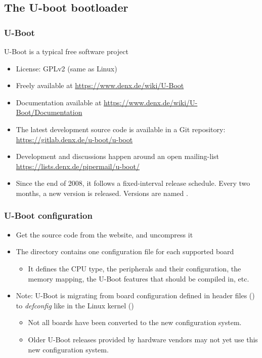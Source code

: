 \subsection{The U-boot bootloader}

\begin{frame}
  \frametitle{U-Boot}
  U-Boot is a typical free software project
  \begin{itemize}
  \item License: GPLv2 (same as Linux)
  \item Freely available at \url{https://www.denx.de/wiki/U-Boot}
  \item Documentation available at
    \url{https://www.denx.de/wiki/U-Boot/Documentation}
  \item The latest development source code is available in a Git
    repository:
    \url{https://gitlab.denx.de/u-boot/u-boot}
  \item Development and discussions happen around an open mailing-list
    \url{https://lists.denx.de/pipermail/u-boot/}
  \item Since the end of 2008, it follows a fixed-interval release
    schedule. Every two months, a new version is released. Versions
    are named .
\end{itemize}
\end{frame}

\begin{frame}
  \frametitle{U-Boot configuration}
  \begin{itemize}
  \item Get the source code from the website, and uncompress it
  \item The  directory contains one configuration file
    for each supported board
    \begin{itemize}
    \item It defines the CPU type, the peripherals and their configuration, the
      memory mapping, the U-Boot features that should be compiled in, etc.
    \end{itemize}
  \item Note: U-Boot is migrating from board configuration defined in
    header files () to {\em defconfig} like in
    the Linux kernel ()
    \begin{itemize}
    \item Not all boards have been converted to the new configuration
      system.
    \item Older U-Boot releases provided by hardware vendors may not
      yet use this new configuration system.
    \end{itemize}
  \end{itemize}
\end{frame}

